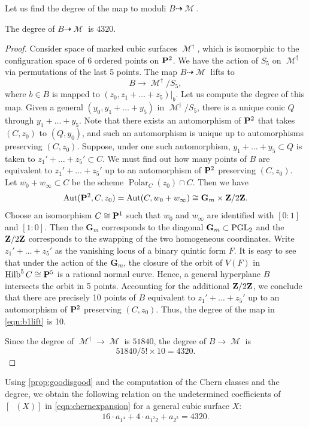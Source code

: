 \documentclass[12pt,reqno]{amsart}
\DeclareMathOperator{\Orb}{\overline{Orb}}
\DeclareMathOperator{\Polar}{Polar}
\DeclareMathOperator{\Hilb}{Hilb}
\DeclareMathOperator{\M}{\mathcal{M}}
\renewcommand{\to}{{\longrightarrow}}
\numberwithin{equation}{section}
\newcommand{\G}{\mathbf G}
\begin{document}
Let us find the degree of the map to moduli $B \dashrightarrow \M$.
\begin{lemma}\label{lem:deg1}
  The degree of $B \dashrightarrow \M$ is $4320$.
\end{lemma}
\begin{proof}
  Consider space of marked cubic surfaces $\M^\dagger$, which is isomorphic to the configuration space of 6 ordered points on $\P^2$.
  We have the action of $S_5$ on $\M^\dagger$ via permutations of the last 5 points.
  The map $B \dashrightarrow \M$ lifts to
  \begin{equation}\label{eqn:b1lift}
    B \to \M^\dagger / S_5,
  \end{equation}
  where $b \in B$ is mapped to $(z_0, z_1 + \dots + z_5)|_b$.
  Let us compute the degree of this map.
  Given a general $(y_0, y_1 + \dots + y_5)$ in $\M^\dagger / S_5$, there is a unique conic $Q$ through $y_1 + \dots + y_5$.
  Note that there exists an automorphism of $\P^2$ that takes $(C, z_0)$ to $(Q, y_0)$, and such an automorphism is unique up to automorphisms preserving $(C, z_0)$.
  Suppose, under one such automorphism, $y_1 + \dots + y_5 \subset Q$ is taken to $z_1' + \dots + z_5' \subset C$.
  We must find out how many points of $B$ are equivalent to $z_1' + \dots + z_5'$ up to an automorphism of $\P^2$ preserving $(C, z_0)$.
  Let $w_0 + w_\infty \subset C$ be the scheme $\Polar_C(z_0) \cap C$.
  Then we have
   \[\Aut(\P^2, C, z_0) = \Aut(C, w_0 + w_{\infty}) \cong \G_m \times \Z/2\Z. \]
   Choose an isomorphism $C \cong \P^1$ such that $w_0$ and $w_\infty$ are identified with $[0:1]$ and $[1:0]$.
   Then the $\G_m$ corresponds to the diagonal $\G_m \subset \PGL_2$ and the $\Z/2\Z$ corresponds to the swapping of the two homogeneous coordinates.
   Write $z_1' + \dots + z_5'$ as the vanishing locus of a binary quintic form $F$.
   It is easy to see that under the action of the $\G_m$, the closure of the orbit of $V(F)$ in $\Hilb^5 C \cong \P^5$ is a rational normal curve.
   Hence, a general hyperplane $B$ intersects the orbit in 5 points.
   Accounting for the additional $\Z/2\Z$, we conclude that there are precisely 10 points of $B$ equivalent to $z_1' + \dots + z_5'$ up to an automorphism of $\P^2$ preserving $(C, z_0)$.
   Thus, the degree of the map in \eqref{eqn:b1lift} is 10.

   Since the degree of $\M^\dagger \to \M$ is $51840$, the degree of $B \to \M$ is
   \[51840/5! \times 10 = 4320.\]
\end{proof}

Using \autoref{prop:goodisgood} and the computation of the Chern classes and the degree, we obtain the following relation on the undetermined coefficients of $[\Orb(X)]$ in
\eqref{eqn:chernexpansion} for a general cubic surface $X$:
\begin{align}
  \label{eq:relation1}
  16 \cdot a_{1^4} + 4 \cdot a_{1^2 2} + a_{2^2} = 4320.
\end{align}
\end{document}
